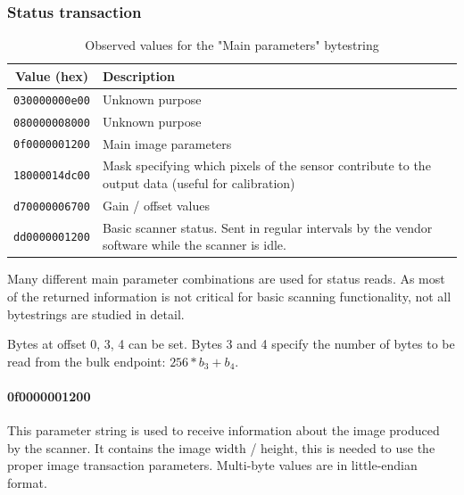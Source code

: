\documentclass{article}
\begin{document}
\subsubsection{Status transaction}
\label{appendix_status}
\begin{table}[H]
  \caption{Observed values for the "Main parameters" bytestring}
  \centering
  \begin{tabular}{c | p{7cm}}
    Value (hex) & Description \\ \hline
    {\tt 030000000e00} & Unknown purpose \\
    {\tt 080000008000} & Unknown purpose \\
    {\tt 0f0000001200} & Main image parameters \\
    {\tt 18000014dc00} & Mask specifying which pixels of the sensor contribute to the output data (useful for calibration) \\
    {\tt d70000006700} & Gain / offset values \\
    {\tt dd0000001200} & Basic scanner status. Sent in regular intervals by the vendor software while the scanner is idle. \\

  \end{tabular}
  \label{table:read_param}
\end{table}

Many different main parameter combinations are used for status reads. As most of the returned
information is not critical for basic scanning functionality, not all bytestrings are
studied in detail.

Bytes at offset 0, 3, 4 can be set. Bytes 3 and 4 specify the number of bytes to
be read from the bulk endpoint: $256 * b_3 + b_4$.

\paragraph{0f0000001200}

This parameter string is used to receive information about the image produced by the scanner.
It contains the image width / height, this is needed to use the proper image transaction
parameters. Multi-byte values are in little-endian format.
\end{document}
